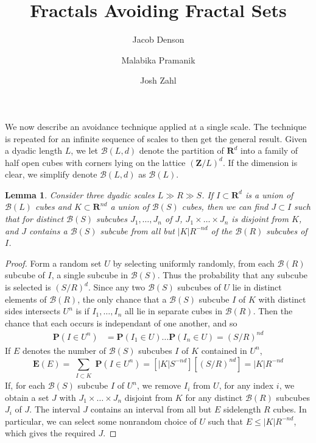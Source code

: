 \documentclass{article}
\title{Fractals Avoiding Fractal Sets}
\author{Jacob Denson\\ \and Malabika Pramanik\\ \and Josh Zahl}
\theoremstyle{plain}
\newtheorem{lemma}{Lemma}
\theoremstyle{plain}
\begin{document}
\maketitle

We now describe an avoidance technique applied at a single scale. The technique is repeated for an infinite sequence of scales to then get the general result. Given a dyadic length $L$, we let $\mathcal{B}(L,d)$ denote the partition of $\mathbf{R}^d$ into a family of half open cubes with corners lying on the lattice $(\mathbf{Z}/L)^d$. If the dimension is clear, we simplify denote $\mathcal{B}(L,d)$ as $\mathcal{B}(L)$.

\begin{lemma}
	Consider three dyadic scales $L \gg R \gg S$. If $I \subset \mathbf{R}^d$ is a union of $\mathcal{B}(L)$ cubes and $K \subset \mathbf{R}^{nd}$ a union of $\mathcal{B}(S)$ cubes, then we can find $J \subset I$ such that for distinct $\mathcal{B}(S)$ subcubes $J_1, \dots, J_n$ of $J$, $J_1 \times \dots \times J_n$ is disjoint from $K$, and $J$ contains a $\mathcal{B}(S)$ subcube from all but $|K|R^{-nd}$ of the $\mathcal{B}(R)$ subcubes of $I$. 
\end{lemma}
\begin{proof}
	Form a random set $U$ by selecting uniformly randomly, from each $\mathcal{B}(R)$ subcube of $I$, a single subcube in $\mathcal{B}(S)$. Thus the probability that any subcube is selected is $(S/R)^d$. Since any two $\mathcal{B}(S)$ subcubes of $U$ lie in distinct elements of $\mathcal{B}(R)$, the only chance that a $\mathcal{B}(S)$ subcube $I$ of $K$ with distinct sides intersects $U^n$ is if $I_1, \dots, I_n$ all lie in separate cubes in $\mathcal{B}(R)$. Then the chance that each occurs is independant of one another, and so
	\begin{align*}
		\mathbf{P}(I \in U^n) &= \mathbf{P}(I_1 \in U) \dots \mathbf{P}(I_n \in U) = (S/R)^{nd}
	\end{align*}
	If $E$ denotes the number of $\mathcal{B}(S)$ subcubes $I$ of $K$ contained in $U^n$,
	\[ \mathbf{E}(E) = \sum_{\substack{I \subset K}} \mathbf{P}(I \in U^n) = [|K| S^{-nd}] [(S/R)^{nd}] = |K| R^{-nd} \]
	If, for each $\mathcal{B}(S)$ subcube $I$ of $U^n$, we remove $I_i$ from $U$, for any index $i$, we obtain a set $J$ with $J_1 \times \dots \times J_n$ disjoint from $K$ for any distinct $\mathcal{B}(R)$ subcubes $J_i$ of $J$. The interval $J$ contains an interval from all but $E$ sidelength $R$ cubes. In particular, we can select some nonrandom choice of $U$ such that $E \leq |K| R^{-nd}$, which gives the required $J$.
\end{proof}
\end{document}
